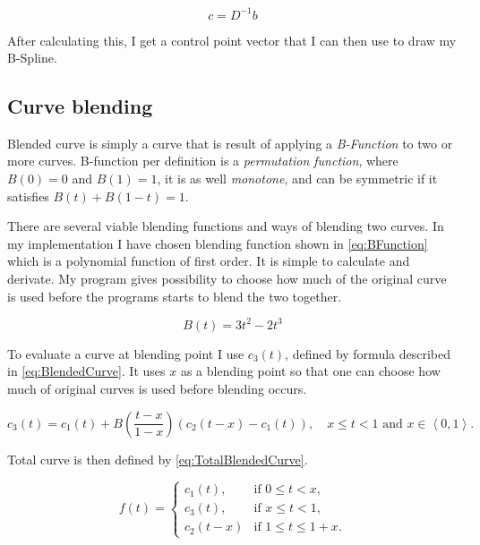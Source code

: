 \documentclass[a4paper,12pt]{extarticle}
\begin{document}
\begin{equation}
c=D^{-1}b
\end{equation}

After calculating this, I get a control point vector that I can then use to draw my B-Spline.

\subsection{Curve blending}
Blended curve is simply a curve that is result of applying a \emph{B-Function} to two or more curves. B-function per definition is a \emph{permutation function}, where $B(0)=0$ and $B(1)=1$, it is as well \emph{monotone}, and can be symmetric if it satisfies $B(t)+B(1-t)=1$. \citep[Chap 6.1]{Laksa2012}

There are several viable blending functions and ways of blending two curves. In my implementation I have chosen blending function shown in \cref{eq:BFunction} which is a polynomial function of first order. It is simple to calculate and derivate. My program gives possibility to choose how much of the original curve is used before the programs starts to blend the two together. \citep[Chap 6.2.2]{Laksa2012}

\begin{equation}
B(t)= 3t^2 - 2t^3
\label{eq:BFunction}
\end{equation}

To evaluate a curve at blending point I use $c_3(t)$, defined by formula described in \cref{eq:BlendedCurve}. It uses $x$ as a blending point so that one can choose how much of original curves is used before blending occurs.

\begin{equation}
c_3(t)= c_1(t) + B\left( \frac{t-x}{1-x} \right) (c_2(t-x) - c_1(t)), \quad x \leq t < 1 \text{ and } x \in \left\langle 0,1 \right\rangle.
\label{eq:BlendedCurve}
\end{equation}

Total curve is then defined by \cref{eq:TotalBlendedCurve}.

\begin{equation}
f(t) =
\begin{cases}
c_1(t), & \text{if }0 \leq t < x,\\
c_3(t), & \text{if } x \leq t < 1,\\
c_2(t-x) & \text{if }1 \leq t \leq 1 + x.
\end{cases}
\label{eq:TotalBlendedCurve}
\end{equation}
\end{document}
